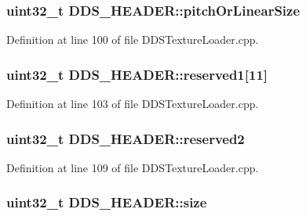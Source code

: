\subsubsection[{\texorpdfstring{pitch\+Or\+Linear\+Size}{pitchOrLinearSize}}]{\setlength{\rightskip}{0pt plus 5cm}uint32\+\_\+t D\+D\+S\+\_\+\+H\+E\+A\+D\+E\+R\+::pitch\+Or\+Linear\+Size}\hypertarget{struct_d_d_s___h_e_a_d_e_r_a77410ea1d2209672fc6651b5322a9306_a77410ea1d2209672fc6651b5322a9306}{}\label{struct_d_d_s___h_e_a_d_e_r_a77410ea1d2209672fc6651b5322a9306_a77410ea1d2209672fc6651b5322a9306}


Definition at line 100 of file D\+D\+S\+Texture\+Loader.\+cpp.

\subsubsection[{\texorpdfstring{reserved1}{reserved1}}]{\setlength{\rightskip}{0pt plus 5cm}uint32\+\_\+t D\+D\+S\+\_\+\+H\+E\+A\+D\+E\+R\+::reserved1\mbox{[}11\mbox{]}}\hypertarget{struct_d_d_s___h_e_a_d_e_r_a589e935e11a1d8193101741109710319_a589e935e11a1d8193101741109710319}{}\label{struct_d_d_s___h_e_a_d_e_r_a589e935e11a1d8193101741109710319_a589e935e11a1d8193101741109710319}


Definition at line 103 of file D\+D\+S\+Texture\+Loader.\+cpp.

\subsubsection[{\texorpdfstring{reserved2}{reserved2}}]{\setlength{\rightskip}{0pt plus 5cm}uint32\+\_\+t D\+D\+S\+\_\+\+H\+E\+A\+D\+E\+R\+::reserved2}\hypertarget{struct_d_d_s___h_e_a_d_e_r_a2b94becd3bfcb64930551d3bb4387198_a2b94becd3bfcb64930551d3bb4387198}{}\label{struct_d_d_s___h_e_a_d_e_r_a2b94becd3bfcb64930551d3bb4387198_a2b94becd3bfcb64930551d3bb4387198}


Definition at line 109 of file D\+D\+S\+Texture\+Loader.\+cpp.

\subsubsection[{\texorpdfstring{size}{size}}]{\setlength{\rightskip}{0pt plus 5cm}uint32\+\_\+t D\+D\+S\+\_\+\+H\+E\+A\+D\+E\+R\+::size}\hypertarget{struct_d_d_s___h_e_a_d_e_r_a989502ea402a8e5939395a6b98ae9ce0_a989502ea402a8e5939395a6b98ae9ce0}{}\label{struct_d_d_s___h_e_a_d_e_r_a989502ea402a8e5939395a6b98ae9ce0_a989502ea402a8e5939395a6b98ae9ce0}


